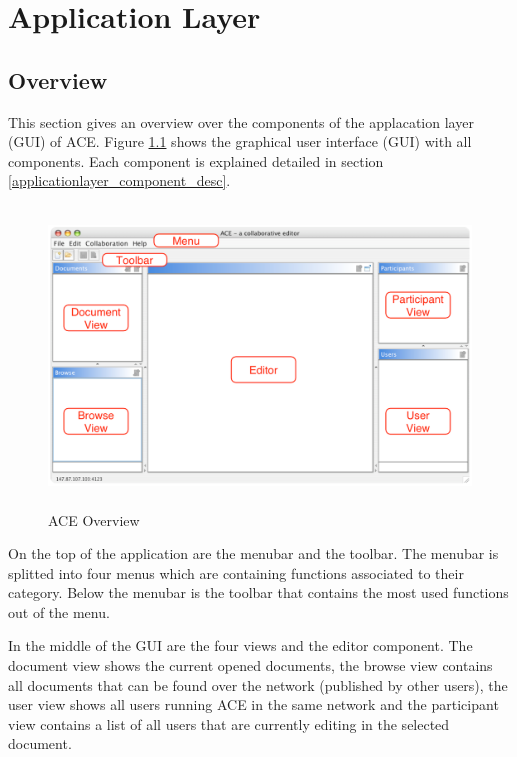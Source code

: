\chapter{Application Layer}
\label{chapter:applicationlayer}

\section{Overview}
This section gives an overview over the components of the applacation layer (GUI) of ACE. Figure \ref{applicationlayer_ace_overview} shows the graphical user interface (GUI) with all components. Each component is explained detailed in section \ref{applicationlayer_component_desc}.
\begin{figure}[H]
\begin{center}
  \includegraphics[height=3.135in, width=5.01in]{../images/finalreport/application_ace_overview.eps}
\caption{ACE Overview}
\label{applicationlayer_ace_overview}
\end{center}
\end{figure}
On the top of the application are the menubar and the toolbar. The menubar is splitted into four menus which are containing functions associated to their category. Below the menubar is the toolbar that contains the most used functions out of the menu.

In the middle of the GUI are the four views and the editor component. The document view shows the current opened documents, the browse view contains all documents that can be found over the network (published by other users), the user view shows all users running ACE in the same network and the participant view contains a list of all users that are currently editing in the selected document.

